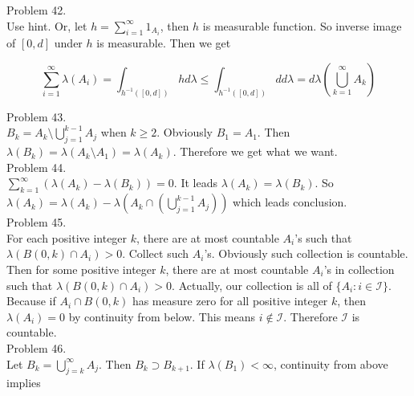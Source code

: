 Problem 42. \\

Use hint. Or, let $h = \sum_{i=1}^{\infty}1_{A_i}$, then $h$ is measurable function. So inverse image of $\left [ 0, d \right ]$ under $h$ is measurable. Then we get

\begin{equation*}
	\sum_{i=1}^{\infty}\lambda \left ( A_i \right ) = \int_{h^{-1}\left ( \left [ 0, d \right ] \right )} h d\lambda \leq \int_{h^{-1}\left ( \left [ 0, d \right ] \right )}d d\lambda = d\lambda\left ( \bigcup_{k=1}^{\infty} A_{k} \right )
\end{equation*}

Problem 43. \\

$B_{k} = A_{k} \setminus \bigcup_{j=1}^{k-1}A_{j}$ when $k \geq 2$. Obviously $B_{1} = A_{1}$. Then $\lambda \left ( B_k \right ) = \lambda \left ( A_k \setminus A_1 \right ) = \lambda\left ( A_k \right )$. Therefore we get what we want.\\

Problem 44. \\

$\sum_{k=1}^{\infty} \left ( \lambda \left ( A_k \right ) - \lambda \left ( B_k \right ) \right ) = 0$. It leads $\lambda \left ( A_k \right ) = \lambda \left ( B_k \right )$. So $\lambda \left ( A_k \right ) = \lambda \left ( A_k \right ) - \lambda \left ( A_k \cap \left ( \bigcup _{j=1}^{k-1}A_j \right ) \right ) $ which leads conclusion.\\

Problem 45. \\

For each positive integer $k$, there are at most countable $A_i$'s such that $\lambda\left ( B(0, k) \cap A_i \right ) > 0$. Collect such $A_i$'s. Obviously such collection is countable. Then for some positive integer $k$, there are at most countable $A_i$'s in collection such that $\lambda \left ( B(0, k) \cap A_i \right ) > 0$. Actually, our collection is all of $\{ A_i : i \in \mathcal{I} \}$. Because if $A_i \cap B(0, k)$ has measure zero for all positive integer $k$, then $\lambda \left ( A_i \right ) = 0$ by continuity from below. This means $i \notin \mathcal{I} $. Therefore $\mathcal{I}$ is countable.\\

Problem 46. \\

Let $B_k = \bigcup_{j=k}^{\infty}A_j$. Then $B_k \supset B_{k+1}$. If $\lambda\left (B_1 \right ) < \infty$, continuity from above implies 

